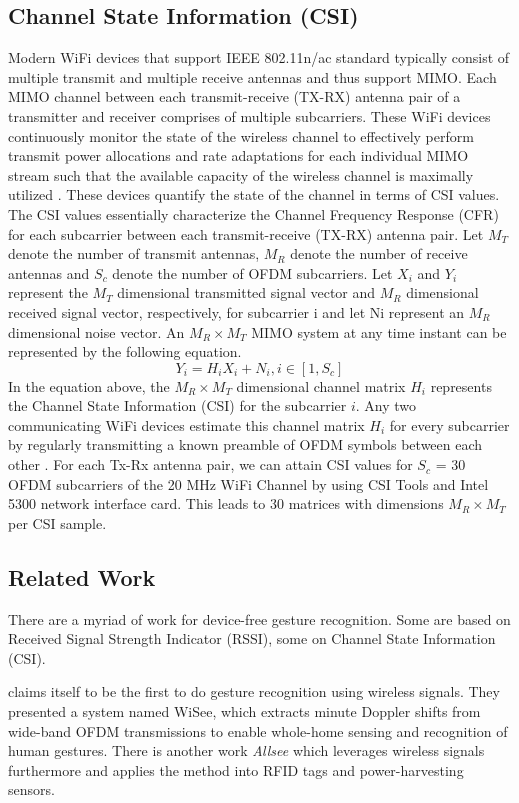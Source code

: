 \documentclass[conference]{IEEEtran}
\begin{document}
\subsection{Channel State Information (CSI)}
Modern WiFi devices that support IEEE 802.11n/ac standard typically consist of multiple transmit and multiple receive antennas and thus support MIMO. Each MIMO channel between each transmit-receive (TX-RX) antenna pair of a transmitter and receiver comprises of multiple subcarriers. These WiFi devices continuously monitor the state of the wireless channel to effectively perform transmit power allocations and rate adaptations for each individual MIMO stream such that the available capacity of the wireless channel is maximally utilized \cite{halperin2010802}. These devices quantify the state of the channel in terms of CSI values. The CSI values essentially characterize the Channel Frequency Response (CFR) for each subcarrier between each transmit-receive (TX-RX) antenna pair.
Let $M_T$ denote the number of transmit antennas, $M_R$ denote the number of receive antennas and $S_c$ denote the number of OFDM subcarriers. Let $X_i$ and $Y_i$ represent the $M_T$ dimensional transmitted signal vector and $M_R$ dimensional received signal vector, respectively, for subcarrier i and let Ni represent an $M_R$ dimensional noise vector. An $M_R \times M_T$ MIMO system at any time instant can be represented by the following equation.
\begin{equation}
	Y_i = H_iX_i + N_i, i \in [1, S_c]
\end{equation}
In the equation above, the $M_R \times M_T$ dimensional channel matrix $H_i$ represents the Channel State Information (CSI) for the subcarrier $i$. Any two communicating WiFi devices estimate this channel matrix $H_i$ for every subcarrier by regularly transmitting a known preamble of OFDM symbols between each other \cite{ali2015keystroke}. For each Tx-Rx antenna pair, we can attain CSI values for $S_c$ = 30 OFDM subcarriers of the 20 MHz WiFi Channel by using CSI Tools and Intel 5300 network interface card. This leads to 30 matrices with dimensions $M_R \times M_T$ per CSI sample.
\subsection{Related Work}
There are a myriad of work for device-free gesture recognition. Some are based on Received Signal Strength Indicator (RSSI), some on Channel State Information (CSI).

\cite{pu2013whole} claims itself to be the first to do gesture recognition using wireless signals. 
They presented a system named WiSee, which extracts minute Doppler shifts from wide-band OFDM transmissions to enable whole-home sensing and recognition of human gestures.
There is another work \emph{Allsee} \cite{kellogg2014bringing} which leverages wireless signals furthermore and applies the method into RFID tags and power-harvesting sensors.
\end{document}
